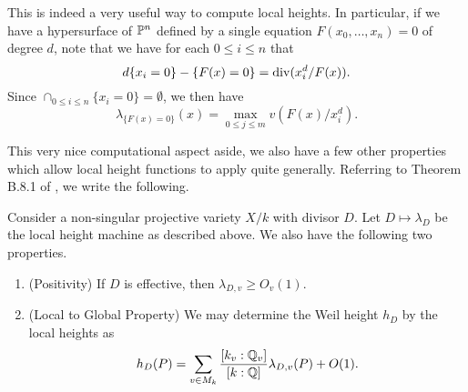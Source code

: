 This is indeed a very useful way to compute local heights.
In particular, if we have a hypersurface of $\mathbb{P}^n$ defined by a single equation $F(x_0, \ldots, x_n) = 0$ of degree $d$,
note that we have for each $0 \leq i \leq n$ that
\[
    d\{ x_i = 0\} - \{ F(x) = 0 \} = {\rm div}(x_i^d/F(x)).
\]
Since $\cap_{0 \leq i \leq n} \{ x_i = 0\} = \emptyset$, we then have
\[
    \lambda_{\{F(x) = 0\}}(x) = \max_{0 \leq j \leq m} v(F(x)/x_i^d).
\]

This very nice computational aspect aside,
we also have a few other properties which allow local height functions to apply quite generally.
Referring to Theorem B.8.1 of \cite{Silverman_Hindry_2013}, we write the following.

\begin{theorem}
    Consider a non-singular projective variety $X/k$ with divisor $D$.
    Let $D \mapsto \lambda_D$ be the local height machine as described above.
    We also have the following two properties.
    \begin{enumerate}
        \item (Positivity) If $D$ is effective, then $\lambda_{D,v} \geq O_v(1)$.
        \item (Local to Global Property) We may determine the Weil height $h_D$ by the local heights as
        \[
            h_D(P) = \sum_{v \in M_k} \frac{[k_v : \mathbb{Q}_v]}{[k : \mathbb{Q}]} \lambda_{D, v}(P) + O(1).
        \]
    \end{enumerate}
\end{theorem}